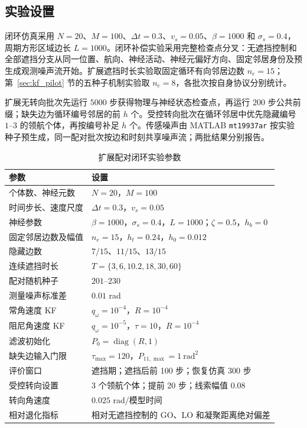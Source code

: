 \documentclass[UTF8,fontset=windows,11pt]{ctexart}
\begin{document}
\subsection{实验设置}

闭环仿真采用 $N=20$、$M=100$、$\Delta t=0.3$、$v_s=0.05$、$\beta=1000$ 和 $\sigma_s=0.4$，周期方形区域边长 $L=1000$。闭环补偿实验采用完整检查点分叉：无遮挡控制和全部遮挡分支从同一位置、航向、神经活动、神经元偏好方向、固定邻居身份及预生成观测噪声流开始。扩展遮挡时长实验取固定循环有向邻居边数 $n_e=15$；第~\ref{sec:kf_pilot} 节的五种子机制实验取 $n_e=8$，各批次按自身协议分别统计。

扩展无转向批次先运行 $5000$ 步获得物理与神经状态检查点，再运行 $200$ 步公共前缀；缺失边为循环编号邻居的前 $h$ 个。受控转向批次在循环邻居中优先隐藏编号 $1$--$3$ 的领航个体，再按编号补足 $h$ 个。传感噪声由 MATLAB \texttt{mt19937ar} 按实验种子预生成，同一配对批次按边和时刻共享噪声流；两批结果分别报告。

\begin{table}[!tbp]
 \centering
 \small
 \caption{扩展配对闭环实验参数}
 \label{tab:simulation_setup}
 \begin{tabular}{ll}
 \toprule
 参数 & 设置\\
 \midrule
 个体数、神经元数 & $N=20$，$M=100$\\
 时间步长、速度尺度 & $\Delta t=0.3$，$v_s=0.05$\\
 神经参数 & $\beta=1000$，$\sigma_s=0.4$，$L=1000$；$\zeta=0.5$，$h_b=0$\\
 固定邻居边数及幅值 & $n_e=15$，$h_t=0.24$，$h_0=0.012$\\
 隐藏边数 & $7/15$、$11/15$、$13/15$\\
 连续遮挡时长 & $T=\{3,6,10.2,18,30,60\}$\\
 配对随机种子 & $201$--$230$\\
 测量噪声标准差 & $0.01$ rad\\
 常角速度 KF & $q_\omega=10^{-4}$，$R=10^{-4}$\\
 阻尼角速度 KF & $q_\omega=10^{-5}$，$\tau=10$，$R=10^{-4}$\\
 滤波初始化 & $P_0=\operatorname{diag}(R,1)$\\
缺失边输入门限 & $\tau_{\max}=120$，$P_{11,\max}=1\ \mathrm{rad}^2$\\
评价窗口 & 遮挡期；遮挡后前 100 步；恢复仿真 300 步\\
受控转向设置 & 3 个领航个体；提前 20 步；线索幅值 $0.08$\\
转向角速度 & $0.025$ rad/模型时间\\
相对退化指标 & 相对无遮挡控制的 GO、LO 和凝聚距离绝对偏差\\
 \bottomrule
 \end{tabular}
\end{table}
\end{document}

